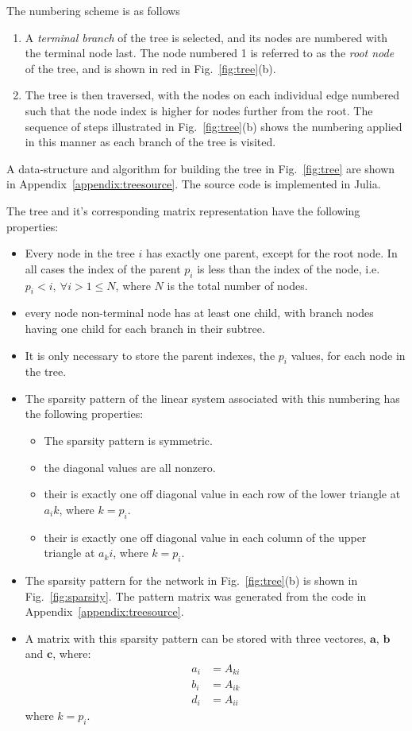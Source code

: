 \documentclass[11pt,a4paper]{article}
\newcommand{\fig}[1]{Fig.~\ref{#1}}
\newcommand{\ap}[1]{Appendix~\ref{#1}}
\newcommand{\vv}[1]{\mathbf{#1}}
\begin{document}
The numbering scheme is as follows
\begin{enumerate}
\item
    A \emph{terminal branch} of the tree is selected, and its nodes are numbered with the terminal node last.
    The node numbered 1 is referred to as the \emph{root node} of the tree, and is shown in red in \fig{fig:tree}(b).
\item
    The tree is then traversed, with the nodes on each individual edge numbered such that the node index is higher for nodes further from the root. The sequence of steps illustrated in \fig{fig:tree}(b) shows the numbering applied in this manner as each branch of the tree is visited.
\end{enumerate}
A data-structure and algorithm for building the tree in \fig{fig:tree} are shown in \ap{appendix:treesource}. The source code is implemented in Julia.

The tree and it's corresponding matrix representation have the following properties:
\begin{itemize}
\item
    Every node in the tree $i$ has exactly one parent, except for the root node. In all cases the index of the parent $p_i$ is less than the index of the node, i.e. $p_i<i,~\forall i>1\leq N$, where $N$ is the total number of nodes.
\item
    every node non-terminal node has at least one child, with branch nodes having one child for each branch in their subtree.
\item
    It is only necessary to store the parent indexes, the $p_i$ values, for each node in the tree.
\item
    The sparsity pattern of the linear system associated with this numbering has the following properties:
    \begin{itemize}
    \item
        The sparsity pattern is symmetric.
    \item
        the diagonal values are all nonzero.
    \item
        their is exactly one off diagonal value in each row of the lower triangle at $a_ik$, where $k=p_i$.
    \item
        their is exactly one off diagonal value in each column of the upper triangle at $a_ki$, where $k=p_i$.
    \end{itemize}
\item
    The sparsity pattern for the network in \fig{fig:tree}(b) is shown in \fig{fig:sparsity}. The pattern matrix was generated from the code in \ap{appendix:treesource}.
\item
    A matrix with this sparsity pattern can be stored with three vectores, $\vv{a}$, $\vv{b}$ and $\vv{c}$, where:
    \begin{align}
        a_i &= A_{ki} \\
        b_i &= A_{ik} \\
        d_i &= A_{ii}
    \end{align}
    where $k=p_i$.
\end{itemize}
\end{document}
